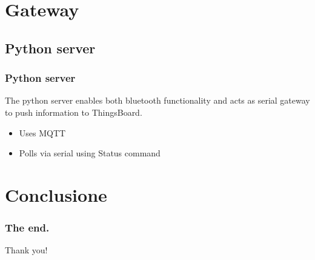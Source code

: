 \documentclass[12pt]{beamer}
\begin{document}
\section{Gateway}
\subsection{Python server}

\begin{frame}
    \frametitle{Python server}

The python server enables both bluetooth functionality and acts as serial gateway to push information to ThingsBoard.
\begin{itemize}
    \item Uses MQTT
    \item Polls via serial using Status command
\end{itemize}

\end{frame}




\section{Conclusione}


\begin{frame}
    \frametitle{The end.}
    \begin{center}

        Thank you!
\end{center}
    \end{frame}










\end{document}
